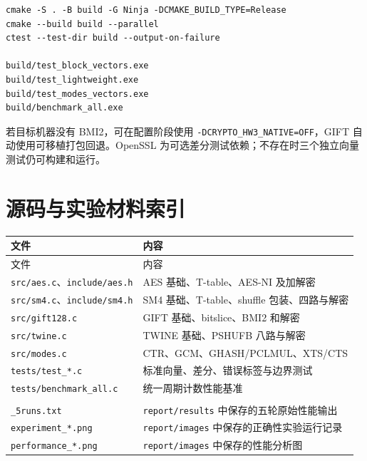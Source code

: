 \documentclass[a4paper,12pt]{ctexart}
\begin{document}
\begin{lstlisting}[language={}]
cmake -S . -B build -G Ninja -DCMAKE_BUILD_TYPE=Release
cmake --build build --parallel
ctest --test-dir build --output-on-failure

build/test_block_vectors.exe
build/test_lightweight.exe
build/test_modes_vectors.exe
build/benchmark_all.exe
\end{lstlisting}

若目标机器没有 BMI2，可在配置阶段使用 \texttt{-DCRYPTO\_HW3\_NATIVE=OFF}，GIFT 自动使用可移植打包回退。OpenSSL 为可选差分测试依赖；不存在时三个独立向量测试仍可构建和运行。

\section{源码与实验材料索引}

\begin{longtable}{p{5.0cm}p{9.0cm}}
\toprule
文件 & 内容\\
\midrule
\endfirsthead
\toprule
文件 & 内容\\
\midrule
\endhead
\texttt{src/aes.c}、\texttt{include/aes.h} & AES 基础、T-table、AES-NI 及加解密\\
\texttt{src/sm4.c}、\texttt{include/sm4.h} & SM4 基础、T-table、shuffle 包装、四路与解密\\
\texttt{src/gift128.c} & GIFT 基础、bitslice、BMI2 和解密\\
\texttt{src/twine.c} & TWINE 基础、PSHUFB 八路与解密\\
\texttt{src/modes.c} & CTR、GCM、GHASH/PCLMUL、XTS/CTS\\
\texttt{tests/test\_*.c} & 标准向量、差分、错误标签与边界测试\\
\texttt{tests/benchmark\_all.c} & 统一周期计数性能基准\\
\shortstack[l]{\texttt{performance\_raw}\\\texttt{\_5runs.txt}} & \texttt{report/results} 中保存的五轮原始性能输出\\
\texttt{experiment\_*.png} & \texttt{report/images} 中保存的正确性实验运行记录\\
\texttt{performance\_*.png} & \texttt{report/images} 中保存的性能分析图\\
\bottomrule
\end{longtable}
\end{document}
